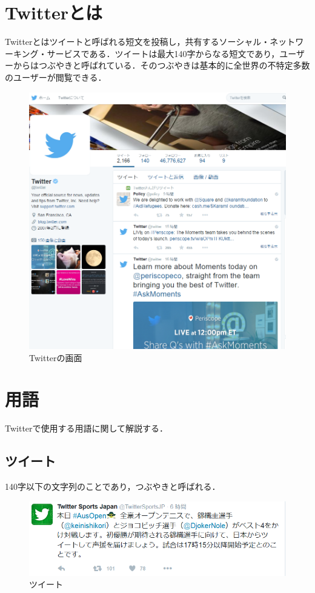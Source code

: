 \section{Twitterとは}

Twitterとはツイートと呼ばれる短文を投稿し，共有するソーシャル・ネットワーキング・サービスである．ツイートは最大140字からなる短文であり，ユーザーからはつぶやきと呼ばれている．そのつぶやきは基本的に全世界の不特定多数のユーザーが閲覧できる．

\begin{figure}[H]
\centering
\includegraphics[width=12cm]{twitter000.png}
\caption{Twitterの画面}\label{実際のTwitterの画面}
\end{figure}

\section{用語}
Twitterで使用する用語に関して解説する．

\subsection{ツイート}

140字以下の文字列のことであり，つぶやきと呼ばれる．


\begin{figure}[H]
\centering
\includegraphics[width=12cm]{tweet001.png}
\caption{ツイート}\label{実際のツイートの画面}
\end{figure}

